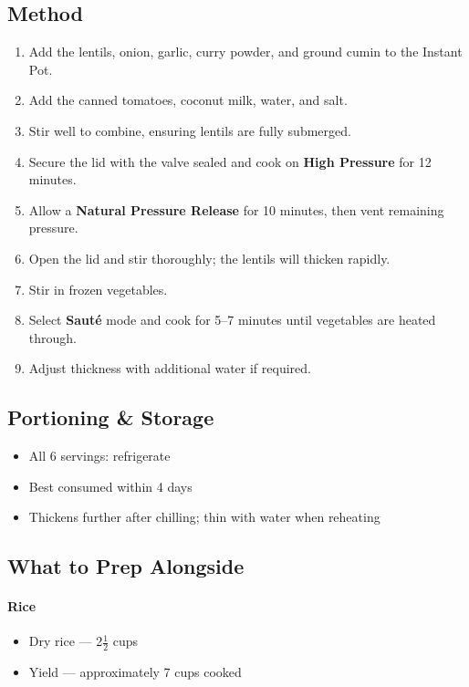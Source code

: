 \documentclass[11pt,a4paper]{article}
\begin{document}
\vspace{0.5em}

\subsection*{Method}
\begin{enumerate}
    \item Add the lentils, onion, garlic, curry powder, and ground cumin to the Instant Pot.
    \item Add the canned tomatoes, coconut milk, water, and salt.
    \item Stir well to combine, ensuring lentils are fully submerged.
    \item Secure the lid with the valve sealed and cook on \textbf{High Pressure} for 12 minutes.
    \item Allow a \textbf{Natural Pressure Release} for 10 minutes, then vent remaining pressure.
    \item Open the lid and stir thoroughly; the lentils will thicken rapidly.
    \item Stir in frozen vegetables.
    \item Select \textbf{Sauté} mode and cook for 5--7 minutes until vegetables are heated through.
    \item Adjust thickness with additional water if required.
\end{enumerate}

\vspace{0.5em}

\subsection*{Portioning \& Storage}
\begin{itemize}
    \item All 6 servings: refrigerate
    \item Best consumed within 4 days
    \item Thickens further after chilling; thin with water when reheating
\end{itemize}

\vspace{0.5em}

\subsection*{What to Prep Alongside}

\paragraph{Rice}
\begin{itemize}
    \item Dry rice — 2$\tfrac{1}{2}$ cups
    \item Yield — approximately 7 cups cooked
\end{itemize}
\end{document}
